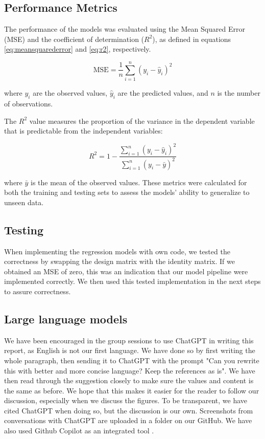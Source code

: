 \subsection{Performance Metrics}

The performance of the models was evaluated using the Mean Squared Error (MSE) and the coefficient of determination ($R^2$), as defined in equations \ref{eq:meansquarederror} and \ref{eq:r2}, respectively. 

\begin{equation}
    \text{MSE} = \frac{1}{n} \sum_{i=1}^{n} (y_i - \hat{y}_i)^2
    \label{eq:meansquarederror}
\end{equation}

where $y_i$ are the observed values, $\hat{y}_i$ are the predicted values, and $n$ is the number of observations.

The $R^2$ value measures the proportion of the variance in the dependent variable that is predictable from the independent variables:

\begin{equation}
    R^2 = 1 - \frac{\sum_{i=1}^{n} (y_i - \hat{y}_i)^2}{\sum_{i=1}^{n} (y_i - \bar{y})^2}
    \label{eq:r2}
\end{equation}

where $\bar{y}$ is the mean of the observed values. These metrics were calculated for both the training and testing sets to assess the models' ability to generalize to unseen data.

\subsection{Testing}
When implementing the regression models with own code, we tested the correctness by swapping the design matrix with the identity matrix. If we obtained an MSE of zero, this was an indication that our model pipeline were implemented correctly. We then used this tested implementation in the next steps to assure correctness. 

\subsection{Large language models}

We have been encouraged in the group sessions to use ChatGPT\cite{openai2023chatgpt} in writing this report, as English is not our first language. We have done so by first writing the whole paragraph, then sending it to ChatGPT with the prompt "Can you rewrite this with better and more concise language? Keep the references as is". We have then read through the suggestion closely to make sure the values and content is the same as before. We hope that this makes it easier for the reader to follow our discussion, especially when we discuss the figures. To be transparent, we have cited ChatGPT when doing so, but the discussion is our own. Screenshots from conversations with ChatGPT are uploaded in a folder on our GitHub. We
have also used Github Copilot as an integrated tool \cite{github_copilot}.


